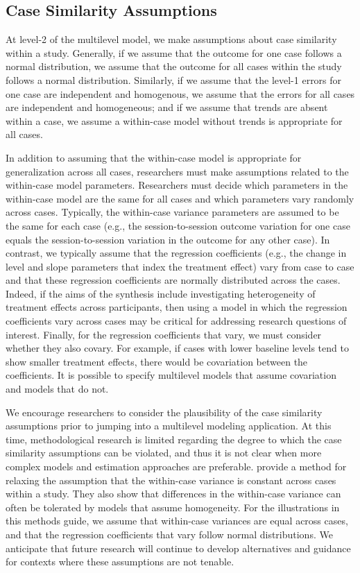 \documentclass[
]{book}
\begin{document}
\hypertarget{case-similarity-assumptions}{%
\subsection{Case Similarity Assumptions}\label{case-similarity-assumptions}}

At level-2 of the multilevel model, we make assumptions about case similarity within a study.
Generally, if we assume that the outcome for one case follows a normal distribution, we assume that the outcome for all cases within the study follows a normal distribution.
Similarly, if we assume that the level-1 errors for one case are independent and homogenous, we assume that the errors for all cases are independent and homogeneous; and if we assume that trends are absent within a case, we assume a within-case model without trends is appropriate for all cases.

In addition to assuming that the within-case model is appropriate for generalization across all cases, researchers must make assumptions related to the within-case model parameters.
Researchers must decide which parameters in the within-case model are the same for all cases and which parameters vary randomly across cases.
Typically, the within-case variance parameters are assumed to be the same for each case (e.g., the session-to-session outcome variation for one case equals the session-to-session variation in the outcome for any other case).
In contrast, we typically assume that the regression coefficients (e.g., the change in level and slope parameters that index the treatment effect) vary from case to case and that these regression coefficients are normally distributed across the cases.
Indeed, if the aims of the synthesis include investigating heterogeneity of treatment effects across participants, then using a model in which the regression coefficients vary across cases may be critical for addressing research questions of interest.
Finally, for the regression coefficients that vary, we must consider whether they also covary.
For example, if cases with lower baseline levels tend to show smaller treatment effects, there would be covariation between the coefficients. It is possible to specify multilevel models that assume covariation and models that do not.

We encourage researchers to consider the plausibility of the case similarity assumptions prior to jumping into a multilevel modeling application.
At this time, methodological research is limited regarding the degree to which the case similarity assumptions can be violated, and thus it is not clear when more complex models and estimation approaches are preferable.
\citet{baek_Ferron_2020} provide a method for relaxing the assumption that the within-case variance is constant across cases within a study.
They also show that differences in the within-case variance can often be tolerated by models that assume homogeneity.
For the illustrations in this methods guide, we assume that within-case variances are equal across cases, and that the regression coefficients that vary follow normal distributions.
We anticipate that future research will continue to develop alternatives and guidance for contexts where these assumptions are not tenable.
\end{document}
